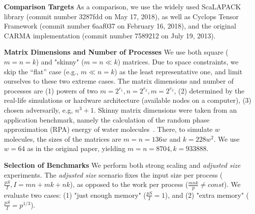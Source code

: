 \documentclass[sigplan,review,anonymous,10pt]{acmart}\settopmatter{printfolios=true,printccs=false,printacmref=false}
\newcommand\mac[1]{\textcolor{red}{[Mac: #1]}}
\newcommand{\macb}[1]{\textbf{\textsf{#1}}}
\begin{document}
\macb{Comparison Targets}
%
As a comparison, we use the widely used ScaLAPACK library (commit number 
3287fdd 
on May 17, 2018), as well 
as Cyclops Tensor Framework (commit number 6aaf037 on February 16, 2018), and 
the original CARMA implementation (commit number 7589212 on July 19, 2013).

\macb{Matrix Dimensions and Number of Processes}
We use both square ($m = n = k$) and "skinny" ($m = n \ll k$) matrices. Due to 
space constraints, we skip the ``flat'' case (e.g., $m \ll n = k$) as the 
least representative one, and limit 
ourselves to these two extreme cases. The matrix dimensions and number of 
processes are (1) powers of 
two $m = 2^{r_1}, n = 2^{r_2}, m = 2^{r_3}$, (2) determined by the real-life 
simulations or hardware architecture (available nodes on a computer), (3) 
chosen adversarily, e.g, $n^3 + 1$. 
Skinny matrix dimensions were taken from an application benchmark, namely the 
calculation of the random phase approximation (RPA) energy of water 
molecules~\cite{joost}. There, to simulate $w$ molecules, the sizes 
of the 
matrices are $m=n=136w$ and $k = 228w^2$. We use $w=64$ as in the 
original paper, yielding $m=n=8704, k = 933888$.

\macb{Selection of Benchmarks}
%
We perform both strong scaling and \emph{adjusted size} experiments. 
The \emph{adjusted size} scenario fixes the input size per process 
($\frac{pS}{I}, I = mn + mk + nk$), as opposed to the work per 
process ($\frac{mnk}{p} \ne const$). We evaluate two cases: (1) "just enough 
memory" ($\frac{pS}{I} = 1$), and (2) "extra memory"  ($\frac{pS}{I} = 
p^{1/3}$).
%
%
%
\end{document}
